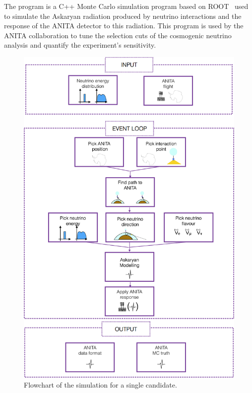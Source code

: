 The \icemc program is a C++ Monte Carlo simulation program based on
ROOT~\cite{brun1997root} used to simulate the Askaryan radiation produced
by neutrino interactions and the response of the ANITA detector to this
radiation.
This program is used by the ANITA collaboration to tune the selection
cuts of the cosmogenic neutrino analysis and quantify the experiment's sensitivity.


\begin{figure}[!h]\centering
  \includegraphics[width=.8\linewidth]{./Figs/IcemcFlowchart.png}
  \caption{Flowchart of the \icemc simulation for a single candidate.}
  \label{fig:intro_icemcFlow}
\end{figure}


